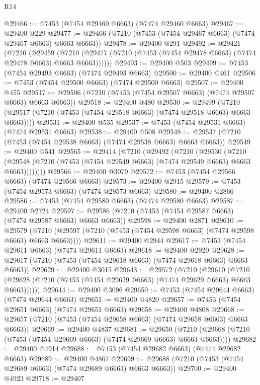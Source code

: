 \begin{lexlean}{R14}
\begin{coremodule}
@29466 := @7453 (@7454 @29460 @6663) (@7474 @29460 @6663)
@29467 := @29400 @229
@29477 := @29466 (@7210 (@7453 (@7454 @29467 @6663) (@7474 @29467 @6663) @6663 @6663))
@29478 := @29400 @291
@29492 := @29421
    (@7210
      (@29459
        (@7210 (@29477 (@7210 (@7453 (@7454 @29478 @6663) (@7474 @29478 @6663) @6663 @6663))))))
@29493 := @29400 @503
@29499 := @7453 (@7454 @29493 @6663) (@7474 @29493 @6663)
@29500 := @29400 @461
@29506 := @7453 (@7454 @29500 @6663) (@7474 @29500 @6663)
@29507 := @29400 @455
@29517 := @29506 (@7210 (@7453 (@7454 @29507 @6663) (@7474 @29507 @6663) @6663 @6663))
@29518 := @29400 @480
@29530 := @29499
    (@7210 (@29517 (@7210 (@7453 (@7454 @29518 @6663) (@7474 @29518 @6663) @6663 @6663))))
@29531 := @29400 @535
@29537 := @7453 (@7454 @29531 @6663) (@7474 @29531 @6663)
@29538 := @29400 @508
@29548 := @29537 (@7210 (@7453 (@7454 @29538 @6663) (@7474 @29538 @6663) @6663 @6663))
@29549 := @29400 @541
@29565 := @29414
    (@7210
      (@29492
        (@7210
          (@29530
            (@7210
              (@29548 (@7210 (@7453 (@7454 @29549 @6663) (@7474 @29549 @6663) @6663 @6663))))))))
@29566 := @29400 @3079
@29572 := @7453 (@7454 @29566 @6663) (@7474 @29566 @6663)
@29573 := @29400 @2915
@29579 := @7453 (@7454 @29573 @6663) (@7474 @29573 @6663)
@29580 := @29400 @2866
@29586 := @7453 (@7454 @29580 @6663) (@7474 @29580 @6663)
@29587 := @29400 @2724
@29597 := @29586 (@7210 (@7453 (@7454 @29587 @6663) (@7474 @29587 @6663) @6663 @6663))
@29598 := @29400 @2871
@29610 := @29579
    (@7210 (@29597 (@7210 (@7453 (@7454 @29598 @6663) (@7474 @29598 @6663) @6663 @6663))))
@29611 := @29400 @2944
@29617 := @7453 (@7454 @29611 @6663) (@7474 @29611 @6663)
@29618 := @29400 @2920
@29628 := @29617 (@7210 (@7453 (@7454 @29618 @6663) (@7474 @29618 @6663) @6663 @6663))
@29629 := @29400 @3015
@29643 := @29572
    (@7210
      (@29610
        (@7210 (@29628 (@7210 (@7453 (@7454 @29629 @6663) (@7474 @29629 @6663) @6663 @6663))))))
@29644 := @29400 @3096
@29650 := @7453 (@7454 @29644 @6663) (@7474 @29644 @6663)
@29651 := @29400 @4820
@29657 := @7453 (@7454 @29651 @6663) (@7474 @29651 @6663)
@29658 := @29400 @4808
@29668 := @29657 (@7210 (@7453 (@7454 @29658 @6663) (@7474 @29658 @6663) @6663 @6663))
@29669 := @29400 @4837
@29681 := @29650
    (@7210 (@29668 (@7210 (@7453 (@7454 @29669 @6663) (@7474 @29669 @6663) @6663 @6663))))
@29682 := @29400 @4914
@29688 := @7453 (@7454 @29682 @6663) (@7474 @29682 @6663)
@29689 := @29400 @4867
@29699 := @29688 (@7210 (@7453 (@7454 @29689 @6663) (@7474 @29689 @6663) @6663 @6663))
@29700 := @29400 @4923
@29718 := @29407

\end{coremodule}
\end{lexlean}
